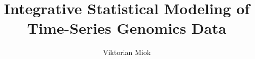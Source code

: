 \title{Integrative Statistical Modeling of Time-Series Genomics Data} 

\author{Viktorian Miok}




 




